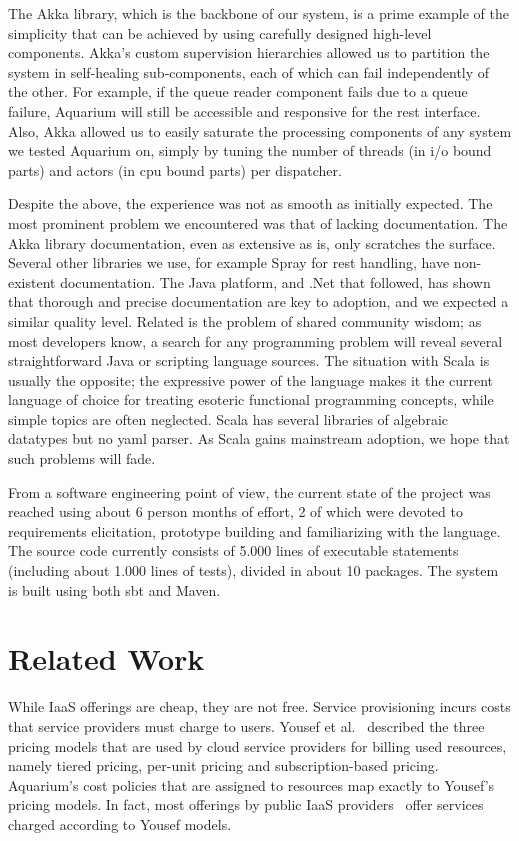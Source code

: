\documentclass[preprint,10pt]{sigplanconf}
\begin{document}
The Akka library, which is the backbone of our system, is a prime example of 
the simplicity that can be achieved by using carefully designed high-level
components. Akka's custom supervision hierarchies allowed us to partition the
system in self-healing sub-components, each of which can fail independently
of the other. For example, if the queue reader component fails due to a queue
failure, Aquarium will still be accessible and responsive for the {\sc rest}
interface. Also, Akka allowed us to easily saturate the processing components
of any system we tested Aquarium on, simply by tuning the number of threads (in
{\sc i/o} bound parts) and actors (in {\sc cpu} bound parts) per dispatcher. 

Despite the above, the experience was not as smooth as initially expected. The
most prominent problem we encountered was that of lacking documentation. The
Akka library documentation, even as extensive as is, only scratches the surface.
Several other libraries we use, for example Spray for {\sc rest} handling, have
non-existent documentation. The Java platform, and .Net that followed, has
shown that thorough and precise documentation are key to adoption, and we
expected a similar quality level. Related is the problem of shared community
wisdom; as most developers know, a search for any programming problem will
reveal several straightforward Java or scripting language sources. The
situation with Scala is usually the opposite; the expressive power of the
language makes it the current language of choice for treating esoteric
functional programming concepts, while simple topics are often neglected. Scala
has several libraries of algebraic datatypes but no {\sc yaml} parser. As Scala
gains mainstream adoption, we hope that such problems will fade.

From a software engineering point of view, the current state of the project was
reached using about 6 person months of effort, 2 of which were devoted to
requirements elicitation, prototype building and familiarizing with the
language. The source code currently consists of 5.000 lines of executable
statements (including about 1.000 lines of tests), divided in about 10
packages. The system is built using both {\sc sbt} and Maven. 


\section{Related Work}

While IaaS offerings are cheap, they are not free. Service provisioning
incurs costs that service providers must charge to users. Yousef et
al.~\cite{Youse08} described the three pricing models that are used by cloud
service providers for billing used resources, namely tiered pricing, per-unit
pricing and subscription-based pricing. Aquarium's cost policies that are
assigned to resources map exactly to Yousef's pricing models. In fact,
most offerings by public IaaS providers~\cite{Azure12, Amaz12} offer
services charged according to Yousef models.
\end{document}

